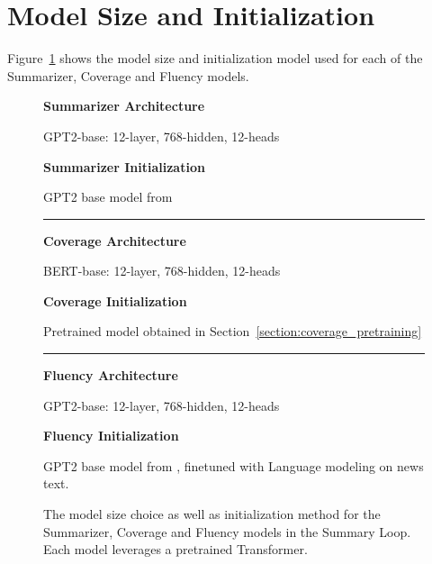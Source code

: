\documentclass[11pt,a4paper]{article}
\begin{document}
\section{Model Size and Initialization}
\label{appendix:size_and_initialization}
 Figure~\ref{fig:model_initialization} shows the model size and initialization model used  for each of the Summarizer, Coverage and Fluency models.
\begin{figure}[!htbp]
    \begin{framed}
        \vspace{-0.5em}
        \begin{center}
            \textbf{Summarizer Architecture}
        \end{center}
        GPT2-base: 12-layer, 768-hidden, 12-heads
        \begin{center}
            \textbf{Summarizer Initialization}
        \end{center}
        GPT2 base model from \citet{radford2019language}
        
        \vspace{0.5em}
        \hrule
        
        \begin{center}
            \textbf{Coverage Architecture}
        \end{center}
        BERT-base: 12-layer, 768-hidden, 12-heads
        \begin{center}
            \textbf{Coverage Initialization}
        \end{center}
        Pretrained model obtained in Section~\ref{section:coverage_pretraining}
    
        \vspace{0.5em}
        \hrule
    
        \begin{center}
            \textbf{Fluency Architecture}
        \end{center}
        GPT2-base: 12-layer, 768-hidden, 12-heads
        \begin{center}
            \textbf{Fluency Initialization}
        \end{center}
        GPT2 base model from \cite{radford2019language}, finetuned with Language modeling on news text.
        \vspace{-1.0em}
    \end{framed}
    \caption{The model size choice as well as initialization method for the Summarizer, Coverage and Fluency models in the Summary Loop. Each model leverages a pretrained Transformer.}
    \label{fig:model_initialization}
\end{figure}
\end{document}

